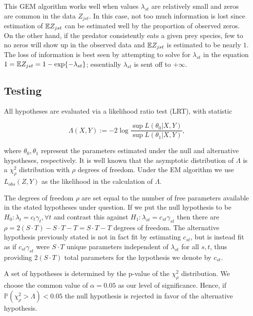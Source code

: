 This GEM algorithm works well when values $\lambda_{st}$ are relatively small and zeros are common in the data $Z_{jst}$.  In this case, not too much information is lost since estimation of $\mathbb{E} Z_{jst}$ can be estimated well by the proportion of observed zeros.  On the other hand, if the predator consistently eats a given prey species, few to no zeros will show up in the observed data and $\mathbb{E} Z_{jst}$ is estimated to be nearly $1$.  The loss of information is best seen by attempting to solve for $\lambda_{st}$ in the equation $1 = \mathbb{E} Z_{jst} = 1 - \exp\{-\lambda_{st}\}$; essentially $\lambda_{st}$ is sent off to $+\infty$. 

\subsection*{Testing}

All hypotheses are evaluated via a likelihood ratio test (LRT), with statistic

\begin{equation*}
  \label{eq:LRT}
    \Lambda(X,Y) := -2 \log{ \frac{ \sup L(\theta_0|X,Y)}{ \sup L(\theta_1|X,Y)} },
\end{equation*}

\noindent where $\theta_0, \theta_1$ represent the parameters estimated under the null and alternative hypotheses, respectively.  It is well known that the asymptotic distribution of $\Lambda$ is a $\chi_{\rho}^2$ distribution with $\rho$ degrees of freedom.  Under the EM algorithm we use $L_{obs}(Z,Y)$ as the likelihood in the calculation of $\Lambda$.  

The degrees of freedom $\rho$ are set equal to the number of free parameters available in the stated hypotheses under question.  If we put the null hypothesis to be $H_0: \lambda_t = c_t \gamma_t, \forall t$ and contrast this against $H_1: \lambda_{st} = c_{st}\gamma_{st}$ then there are $\rho = 2(S \cdot T) - S \cdot T - T = S \cdot T - T$ degrees of freedom.  The alternative hypothesis previously stated is not in fact fit by estimating $c_{st}$, but is instead fit as if $c_{st}\gamma_{st}$ were $S \cdot T$ unique parameters independent of $\lambda_{st}$ for all $s,t$, thus providing $2(S \cdot T)$ total parameters for the hypothesis we denote by $c_{st}$.  

A set of hypotheses is determined by the p-value of the $\chi^2_{\rho}$ distribution.  We choose the common value of $\alpha = 0.05$ as our level of significance.  Hence, if $\mathbb{P}(\chi^2_{\rho} > \Lambda) < 0.05$ the null hypothesis is rejected in favor of the alternative hypothesis.  

